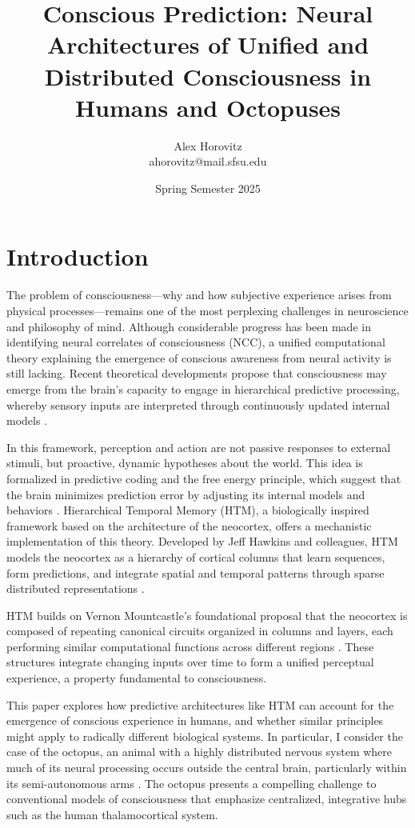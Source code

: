 \documentclass{article}
\title{Conscious Prediction: Neural Architectures of Unified and Distributed Consciousness in Humans and Octopuses}
\author{Alex Horovitz \\ \small ahorovitz@mail.sfsu.edu}
\date{Spring Semester 2025}
\begin{document}
\setlength{\parskip}{0.75em}

\maketitle


\section{Introduction}

The problem of consciousness---why and how subjective experience arises from physical processes---remains one of the most perplexing challenges in neuroscience and philosophy of mind. Although considerable progress has been made in identifying neural correlates of consciousness (NCC), a unified computational theory explaining the emergence of conscious awareness from neural activity is still lacking. Recent theoretical developments propose that consciousness may emerge from the brain's capacity to engage in hierarchical predictive processing, whereby sensory inputs are interpreted through continuously updated internal models \parencite{clark2016surfing, friston2010free}.

In this framework, perception and action are not passive responses to external stimuli, but proactive, dynamic hypotheses about the world. This idea is formalized in predictive coding and the free energy principle, which suggest that the brain minimizes prediction error by adjusting its internal models and behaviors \parencite{friston2010free}. Hierarchical Temporal Memory (HTM), a biologically inspired framework based on the architecture of the neocortex, offers a mechanistic implementation of this theory. Developed by Jeff Hawkins and colleagues, HTM models the neocortex as a hierarchy of cortical columns that learn sequences, form predictions, and integrate spatial and temporal patterns through sparse distributed representations \parencite{hawkins2017theory, hawkins2016why, ahmad2015properties}.

HTM builds on Vernon Mountcastle’s foundational proposal that the neocortex is composed of repeating canonical circuits organized in columns and layers, each performing similar computational functions across different regions \parencite{mountcastle1997columnar}. These structures integrate changing inputs over time to form a unified perceptual experience, a property fundamental to consciousness.

This paper explores how predictive architectures like HTM can account for the emergence of conscious experience in humans, and whether similar principles might apply to radically different biological systems. In particular, I consider the case of the octopus, an animal with a highly distributed nervous system where much of its neural processing occurs outside the central brain, particularly within its semi-autonomous arms \parencite{carls2022where, mather2021octopus, huffard2013cephalopod}. The octopus presents a compelling challenge to conventional models of consciousness that emphasize centralized, integrative hubs such as the human thalamocortical system.
\end{document}
